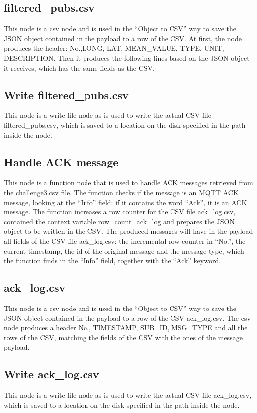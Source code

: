 \subsection{filtered\_pubs.csv}
This node is a csv node and is used in the “Object to CSV” way to save the JSON object contained in the payload to a row of the CSV. At first, the node produces the header: No.,LONG, LAT, MEAN\_VALUE, TYPE, UNIT, DESCRIPTION. Then it produces the following lines based on the JSON object it receives, which has the same fields as the CSV.

\subsection{Write filtered\_pubs.csv}
This node is a write file node as is used to write the actual CSV file filtered\_pubs.csv, which is saved to a location on the disk specified in the path inside the node.

\subsection{Handle ACK message}
This node is a function node that is used to handle ACK messages retrieved from the challenge3.csv file. The function checks if the message is an MQTT ACK message, looking at the “Info” field: if it contains the word “Ack”, it is an ACK message. The function increases a row counter for the CSV file ack\_log.csv, contained the context variable row\_count\_ack\_log and prepares the JSON object to be written in the CSV. The produced messages will have in the payload all fields of the CSV file ack\_log.csv: the incremental row counter in “No.”, the current timestamp, the id of the original message and the message type, which the function finds in the “Info” field, together with the “Ack” keyword.

\subsection{ack\_log.csv}
This node is a csv node and is used in the “Object to CSV” way to save the JSON object contained in the payload to a row of the CSV ack\_log.csv. The csv node produces a header No., TIMESTAMP, SUB\_ID, MSG\_TYPE and all the rows of the CSV, matching the fields of the CSV with the ones of the message payload.

\subsection{Write ack\_log.csv}
This node is a write file node as is used to write the actual CSV file ack\_log.csv, which is saved to a location on the disk specified in the path inside the node.

